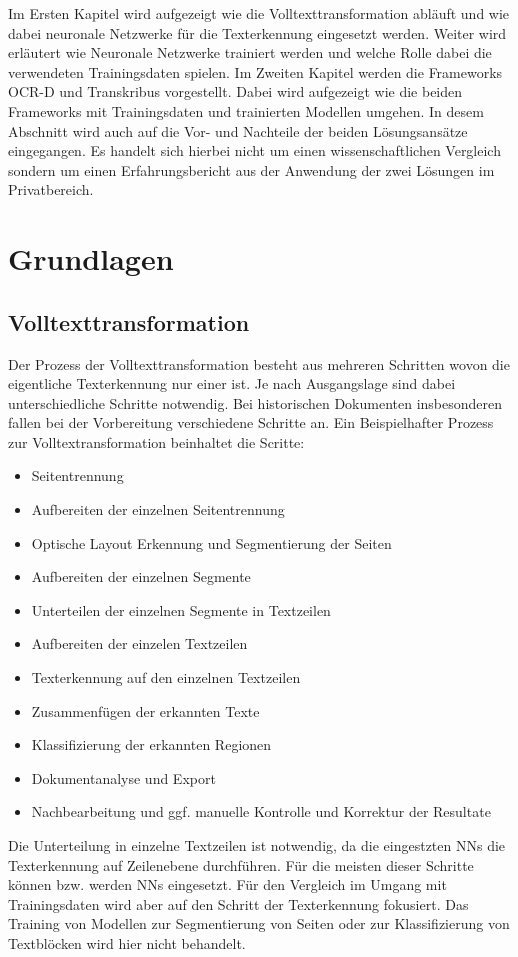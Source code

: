\documentclass[a4paper,oneside, 12pt]{report}
\begin{document}
Im Ersten Kapitel wird aufgezeigt wie die Volltexttransformation abläuft und wie dabei neuronale Netzwerke für die Texterkennung eingesetzt werden. Weiter wird erläutert wie Neuronale Netzwerke trainiert werden und welche Rolle dabei die verwendeten Trainingsdaten spielen. Im Zweiten Kapitel werden die Frameworks OCR-D und Transkribus vorgestellt. Dabei wird aufgezeigt wie die beiden Frameworks mit Trainingsdaten und trainierten Modellen umgehen. In desem Abschnitt wird auch auf die Vor- und Nachteile der beiden Lösungsansätze eingegangen. Es handelt sich hierbei nicht um einen wissenschaftlichen Vergleich sondern um einen Erfahrungsbericht aus der Anwendung der zwei Lösungen im Privatbereich. 

\chapter{Grundlagen}\label{sec:grundlagen}
\section{Volltexttransformation}
Der Prozess der Volltexttransformation besteht aus mehreren Schritten wovon die eigentliche Texterkennung nur einer ist. Je nach Ausgangslage sind dabei unterschiedliche Schritte notwendig. Bei historischen Dokumenten insbesonderen fallen bei der Vorbereitung verschiedene Schritte an. Ein Beispielhafter Prozess zur Volltextransformation beinhaltet die Scritte:
\begin{itemize}\itemsep=0.5pt
  \item Seitentrennung
  \item Aufbereiten der einzelnen Seitentrennung
  \item Optische Layout Erkennung und Segmentierung der Seiten
  \item Aufbereiten der einzelnen Segmente
  \item Unterteilen der einzelnen Segmente in Textzeilen
  \item Aufbereiten der einzelen Textzeilen
  \item Texterkennung auf den einzelnen Textzeilen
  \item Zusammenfügen der erkannten Texte
  \item Klassifizierung der erkannten Regionen
  \item Dokumentanalyse und Export
  \item Nachbearbeitung und ggf. manuelle Kontrolle und Korrektur der Resultate
\end{itemize}
Die Unterteilung in einzelne Textzeilen ist notwendig, da die eingestzten \acp{NN} die Texterkennung auf Zeilenebene durchführen. Für die meisten dieser Schritte können bzw. werden \acp{NN} eingesetzt. Für den Vergleich im Umgang mit Trainingsdaten wird aber auf den Schritt der Texterkennung fokusiert. Das Training von Modellen zur Segmentierung von Seiten oder zur Klassifizierung von Textblöcken wird hier nicht behandelt.
\end{document}
